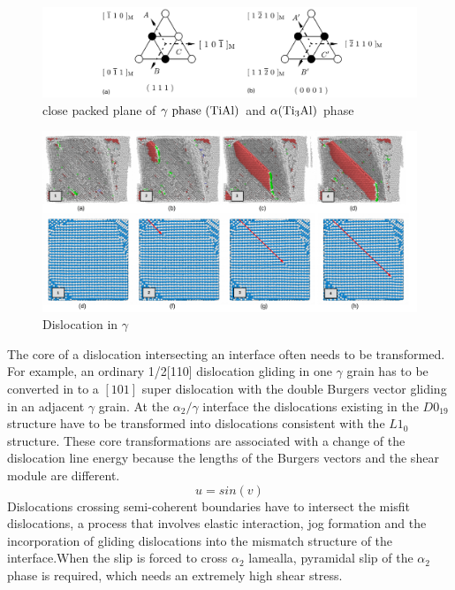 \documentclass[materials,article,submit,moreauthors,pdftex,10pt,a4paper]{Definitions/mdpi}
\begin{document}
\begin{figure}[ht]
	\centering
	\includegraphics[width=1\linewidth]{img/plane}
	\caption{close packed plane of $\gamma\ \rm{phase}\ (\rm{TiAl})$ and $\alpha (\rm{Ti_3Al})$ phase }
	\label{fig:unit-cell}
\end{figure}

	\begin{figure}[ht]
		\centering
		\includegraphics[width=1\linewidth]{"img/disl-gamma"}
		\caption{Dislocation in $\gamma$}
		\label{fig:dis-alpha_2}
	\end{figure}


	
The core of a dislocation intersecting an interface often needs to be transformed. For example, an ordinary 1/2[110] dislocation gliding in one $\gamma$ grain has to be converted in to a $[101]$ super dislocation with the double Burgers vector gliding in an adjacent $\gamma$ grain. At the $\alpha_2/\gamma$ interface the dislocations existing in the $D0_{19}$ structure have to be transformed into dislocations consistent with the $L1_0$structure. These core transformations are associated with a change of the dislocation line energy because the lengths of the Burgers vectors and the shear module are different.
\begin{equation}
u = sin(v)
\end{equation}	
Dislocations crossing semi-coherent boundaries have to intersect the misfit dislocations, a process that involves elastic interaction, jog formation and the incorporation of gliding dislocations into the mismatch structure of the interface.When the slip is forced to cross $\alpha_2$ lamealla, pyramidal slip of the $\alpha_2$ phase is required, which needs an extremely high shear stress.
\end{document}

